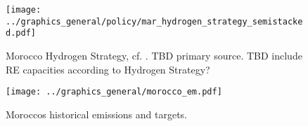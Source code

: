 \begin{figure}
    \centering
    \texttt{[image: ../graphics\_general/policy/mar\_hydrogen\_strategy\_semistacked.pdf]}
    \caption{Morocco Hydrogen Strategy, cf. \cite[p. 14]{Ersoy2022}. TBD primary source. TBD include RE capacities according to Hydrogen Strategy?}
    \label{fig:mar_hydrogen_strategy}
\end{figure}


\begin{figure}[h!]
    \centering
    \texttt{[image: ../graphics\_general/morocco\_em.pdf]}
    \caption{Moroccos historical emissions and targets.}
    \label{fig:morocco_em}
\end{figure}

